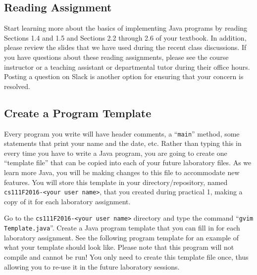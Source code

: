 \vspace*{-.2in}

\subsection*{Reading Assignment}

Start learning more about the basics of implementing Java programs by reading Sections 1.4 and 1.5 and Sections 2.2
through 2.6 of your textbook. In addition, please review the slides that we have used during the recent class
discussions. If you have questions about these reading assignments, please see the course instructor or a teaching
assistant or departmental tutor during their office hours. Posting a question on Slack is another option for ensuring
that your concern is resolved.

\vspace*{-.15in}

\subsection*{Create a Program Template}

Every program you write will have header comments, a ``{\tt main}'' method, some statements that print your name and the
date, etc. Rather than typing this in every time you have to write a Java program, you are going to create one
``template file'' that can be copied into each of your future laboratory files. As we learn more Java, you will be
making changes to this file to accommodate new features. You will store this template in your directory/repository,
named {\tt cs111F2016-<your user name>}, that you created during practical 1, making a copy of it for each laboratory
assignment.

\begin{sloppypar} Go to the {\tt cs111F2016-<your user name>} directory and type the command ``{\tt gvim
  Template.java}''.  Create a Java program template that you can fill in for each laboratory assignment.  See the
  following program template for an example of what your template should look like.  Please note that this program will not
  compile and cannot be run!  You only need to create this template file once, thus allowing you to re-use it in the
future laboratory sessions.  \end{sloppypar}

